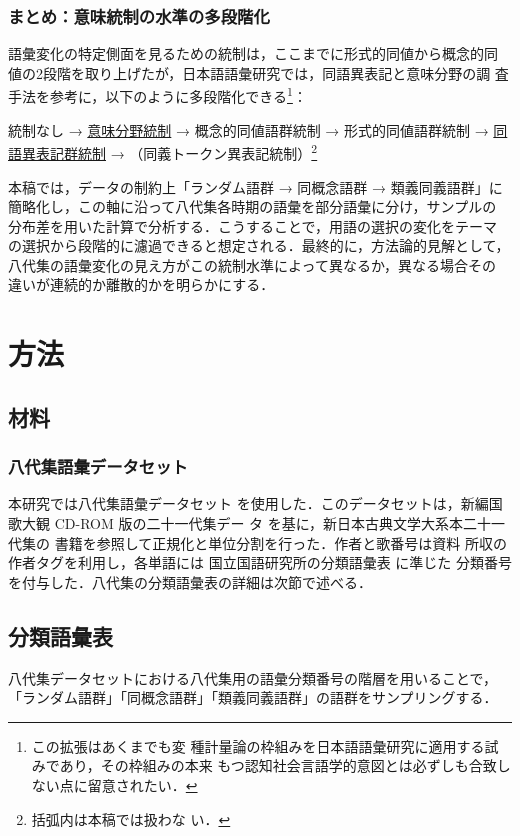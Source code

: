\documentclass[submit]{ipsj}
\begin{document}
\subsubsection{まとめ：意味統制の水準の多段階化}
\label{sec:orgd43c436}
語彙変化の特定側面を見るための統制は，ここまでに形式的同値から概念的同
値の2段階を取り上げたが，日本語語彙研究では，同語異表記と意味分野の調
査手法を参考に，以下のように多段階化できる\footnote{この拡張はあくまでも変
種計量論の枠組みを日本語語彙研究に適用する試みであり，その枠組みの本来
もつ認知社会言語学的意図とは必ずしも合致しない点に留意されたい．}：

統制なし → \uline{意味分野統制} → 概念的同値語群統制 → 形式的同値語群統制 → \uline{同
語異表記群統制} → （同義トークン異表記統制）\footnote{括弧内は本稿では扱わな
い．}

本稿では，データの制約上「ランダム語群 → 同概念語群 → 類義同義語群」に
簡略化し，この軸に沿って八代集各時期の語彙を部分語彙に分け，サンプルの
分布差を用いた計算で分析する．こうすることで，用語の選択の変化をテーマ
の選択から段階的に濾過できると想定される．最終的に，方法論的見解として，
八代集の語彙変化の見え方がこの統制水準によって異なるか，異なる場合その
違いが連続的か離散的かを明らかにする．
\section{方法\label{orgcf95433}}
\label{sec:org4bc6f43}
\subsection{材料\label{org33d2edb}}
\label{sec:org79dfa39}
\subsubsection{八代集語彙データセット\label{org957266b}}
\label{sec:org642fb25}
本研究では八代集語彙データセット \cite{Hodoscek2022Developmenta}
を使用した．このデータセットは，新編国歌大観 CD-ROM 版の二十一代集デー
タ\cite{shinhen1996CDROM} を基に，新日本古典文学大系本二十一代集の
書籍を参照して正規化と単位分割を行った．作者と歌番号は資料
\cite{nakamura1999Kokubungaku} 所収の作者タグを利用し，各単語には
国立国語研究所の分類語彙表 \cite{nakano1994Bunruigoihyo} に準じた
分類番号を付与した．八代集の分類語彙表の詳細は次節で述べる．
\subsection{分類語彙表\label{orge7c00b5}}
\label{sec:orgb6ca4bc}
八代集データセットにおける八代集用の語彙分類番号の階層を用いることで，
「ランダム語群」「同概念語群」「類義同義語群」の語群をサンプリングする．
\end{document}
